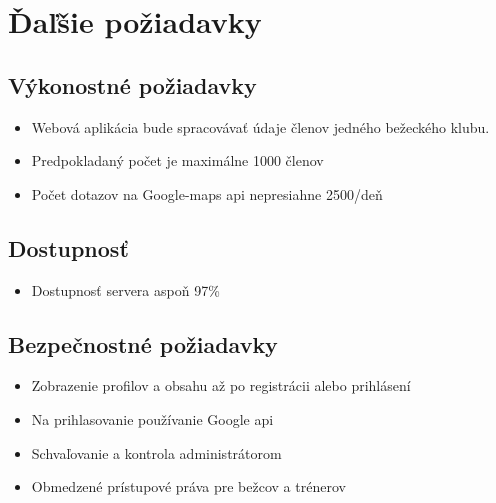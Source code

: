 \documentclass[12pt,a4paper]{report}
\theoremstyle{definition}
\theoremstyle{remark}
\begin{document}
\chapter{Ďaľšie požiadavky}

\section{Výkonostné požiadavky}

\begin{itemize}  
\item Webová aplikácia bude spracovávať údaje členov jedného bežeckého klubu. 
\item Predpokladaný počet je maximálne 1000 členov
\item Počet dotazov na Google-maps api nepresiahne 2500/deň 
\end{itemize}

\section{Dostupnosť}
\begin{itemize}  
\item Dostupnosť servera aspoň 97\%
\end{itemize}

\section{Bezpečnostné požiadavky}
\begin{itemize}  
\item Zobrazenie profilov a obsahu až po registrácii alebo prihlásení
\item Na prihlasovanie používanie Google api
\item Schvaľovanie a kontrola administrátorom 
\item Obmedzené prístupové práva pre bežcov a trénerov
\end{itemize}
\end{document}
